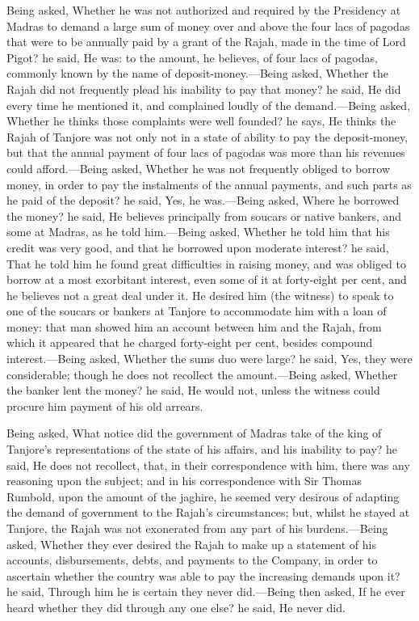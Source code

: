 Being asked, Whether he was not authorized and required by the Presidency at Madras to demand a large sum of money over and above the four lacs of pagodas that were to be annually paid by a grant of the Rajah, made in the time of Lord Pigot? he said, He was: to the amount, he believes, of four lacs of pagodas, commonly known by the name of deposit-money.—Being asked, Whether the Rajah did not frequently plead his inability to pay that money? he said, He did every time he mentioned it, and complained loudly of the demand.—Being asked, Whether he thinks those complaints were well founded? he says, He thinks the Rajah of Tanjore was not only not in a state of ability to pay the deposit-money, but that the annual payment of four lacs of pagodas was more than his revenues could afford.—Being asked, Whether he was not frequently obliged to borrow money, in order to pay the instalments of the annual payments, and such parts as he paid of the deposit? he said, Yes, he was.—Being asked, Where he borrowed the money? he said, He believes principally from soucars or native bankers, and some at Madras, as he told him.—Being asked, Whether he told him that his credit was very good, and that he borrowed upon moderate interest? he said, That he told him he found great difficulties in raising money, and was obliged to borrow at a most exorbitant interest, even some of it at forty-eight per cent, and he believes not a great deal under it. He desired him (the witness) to speak to one of the soucars or bankers at Tanjore to accommodate him with a loan of money: that man showed him an account between him and the Rajah, from which it appeared that he charged forty-eight per cent, besides compound interest.—Being asked, Whether the sums duo were large? he said, Yes, they were considerable; though he does not recollect the amount.—Being asked, Whether the banker lent the money? he said, He would not, unless the witness could procure him payment of his old arrears.

Being asked, What notice did the government of Madras take of the king of Tanjore's representations of the state of his affairs, and his inability to pay? he said, He does not recollect, that, in their correspondence with him, there was any reasoning upon the subject; and in his correspondence with Sir Thomas Rumbold, upon the amount of the jaghire, he seemed very desirous of adapting the demand of government to the Rajah's circumstances; but, whilst he stayed at Tanjore, the Rajah was not exonerated from any part of his burdens.—Being asked, Whether they ever desired the Rajah to make up a statement of his accounts, disbursements, debts, and payments to the Company, in order to ascertain whether the country was able to pay the increasing demands upon it? he said, Through him he is certain they never did.—Being then asked, If he ever heard whether they did through any one else? he said, He never did.

